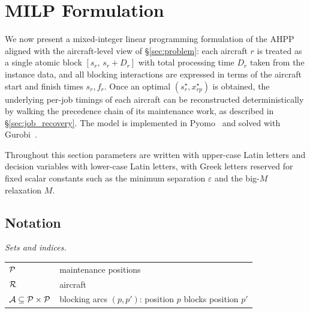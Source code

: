 \section{MILP Formulation}
\label{sec:milp}

We now present a mixed-integer linear programming formulation of the AHPP
aligned with the aircraft-level view of \S\ref{sec:problem}: each aircraft
$r$ is treated as a single atomic block $[s_r,\, s_r + D_r]$ with total
processing time $D_r$ taken from the instance data, and all blocking
interactions are expressed in terms of the aircraft start and finish
times $s_r, f_r$.  Once an optimal $(s_r^\star, x_{rp}^\star)$ is
obtained, the underlying per-job timings of each aircraft can be
reconstructed deterministically by walking the precedence chain of its
maintenance work, as described in \S\ref{sec:job_recovery}.  The model is
implemented in Pyomo~\citep{Bynum2021} and solved with
Gurobi~\citep{Gurobi2023}.

Throughout this section parameters are written with upper-case Latin
letters and decision variables with lower-case Latin letters, with Greek
letters reserved for fixed scalar constants such as the minimum
separation $\varepsilon$ and the big-$M$ relaxation $M$.

\subsection*{Notation}

\noindent\textit{Sets and indices.}
\begin{tabular}{@{}l@{\quad}p{}@{}}
  $\mathcal{P}$
    & maintenance positions \\
  $\mathcal{R}$
    & aircraft \\
  $\mathcal{A} \subseteq \mathcal{P} \times \mathcal{P}$
    & blocking arcs $(p, p')$: position $p$ blocks position $p'$ \\
\end{tabular}


